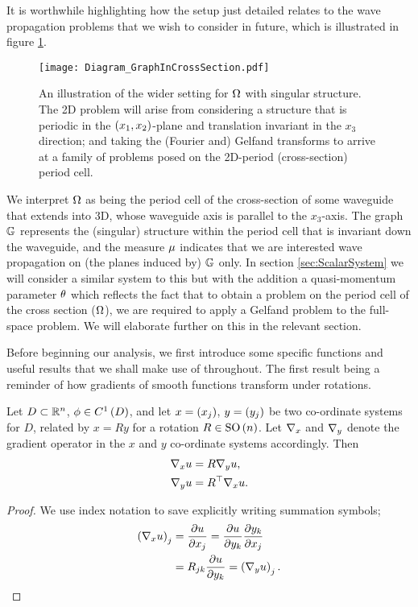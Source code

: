 It is worthwhile highlighting how the setup just detailed relates to the wave propagation problems that we wish to consider in future, which is illustrated in figure \ref{fig:ScalarStrucDiagram}.
\begin{figure}[b!]
	\centering
	\texttt{[image: Diagram\_GraphInCrossSection.pdf]}
	\caption{\label{fig:ScalarStrucDiagram} An illustration of the wider setting for $\Omega$ with singular structure. The 2D problem will arise from considering a structure that is periodic in the $\left( x_1,x_2 \right)$-plane and translation invariant in the $x_3$ direction; and taking the (Fourier and) Gelfand transforms to arrive at a family of problems posed on the 2D-period (cross-section) period cell.}
\end{figure}
We interpret $\Omega$ as being the period cell of the cross-section of some waveguide that extends into 3D, whose waveguide axis is parallel to the $x_3$-axis.
The graph $\mathbb{G}$ represents the (singular) structure within the period cell that is invariant down the waveguide, and the measure $\mu$ indicates that we are interested wave propagation on (the planes induced by) $\mathbb{G}$ only.
In section \ref{sec:ScalarSystem} we will consider a similar system to this but with the addition a quasi-momentum parameter $\theta$ which reflects the fact that to obtain a problem on the period cell of the cross section ($\Omega$), we are required to apply a Gelfand problem to the full-space problem.
We will elaborate further on this in the relevant section. \newline

Before beginning our analysis, we first introduce some specific functions and useful results that we shall make use of throughout.
The first result being a reminder of how gradients of smooth functions transform under rotations.
\begin{lemma} \label{lem:SmoothGradientsUnderRotation}
	Let $D\subset\mathbb{R}^n$, $\phi\in C^1\left( D \right)$, and let $x=\left( x_j \right)$, $y=\left( y_j \right)$ be two co-ordinate systems for $D$, related by $x=Ry$ for a rotation $R\in\mathrm{SO}\left( n \right)$.
	Let $\nabla_x$ and $\nabla_y$ denote the gradient operator in the $x$ and $y$ co-ordinate systems accordingly.
	Then
	\begin{align*}
		\nabla_x u &= R \nabla_y u, \\
		\nabla_y u &= R^{\top} \nabla_x u.
	\end{align*}
\end{lemma}
\begin{proof}
	We use index notation to save explicitly writing summation symbols;
	\begin{align*}
		\left( \nabla_x u \right)_j &= \dfrac{\partial u}{\partial x_j} = \dfrac{\partial u}{\partial y_k}\dfrac{\partial y_k}{\partial x_j} \\
		&= R_{jk}\dfrac{\partial u}{\partial y_k} = \left( \nabla_y u \right)_j.
	\end{align*}
\end{proof}

